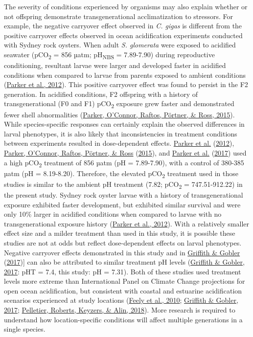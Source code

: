 \documentclass [11pt, proquest] {uwthesis}[2015/03/03]
\begin{document}
The severity of conditions experienced by organisms may also explain whether or not offspring demonstrate transgenerational acclimatization to stressors. For example, the negative carryover effect observed in \emph{C. gigas} is different from the positive carryover effects observed in ocean acidification experiments conducted with Sydney rock oysters. When adult \emph{S. glomerata} were exposed to acidified seawater (pCO\textsubscript{2} = 856 µatm; pH\textsubscript{NBS} = 7.89-7.90) during reproductive conditioning, resultant larvae were larger and developed faster in acidified conditions when compared to larvae from parents exposed to ambient conditions (\protect\hyperlink{ref-Parker2012}{Parker et al., 2012}). This positive carryover effect was found to persist in the F2 generation. In acidified conditions, F2 offspring with a history of transgenerational (F0 and F1) pCO\textsubscript{2} exposure grew faster and demonstrated fewer shell abnormalities (\protect\hyperlink{ref-Parker2015}{Parker, O'Connor, Raftos, Pörtner, \& Ross, 2015}). While species-specific responses can certainly explain the observed differences in larval phenotypes, it is also likely that inconsistencies in treatment conditions between experiments resulted in dose-dependent effects. \protect\hyperlink{ref-Parker2012}{Parker et al.} (\protect\hyperlink{ref-Parker2012}{2012}), \protect\hyperlink{ref-Parker2015}{Parker, O'Connor, Raftos, Pörtner, \& Ross} (\protect\hyperlink{ref-Parker2015}{2015}), and \protect\hyperlink{ref-Parker2017}{Parker et al.} (\protect\hyperlink{ref-Parker2017}{2017}) used a high pCO\textsubscript{2} treatment of 856 µatm (pH = 7.89-7.90), with a control of 380-385 µatm (pH = 8.19-8.20). Therefore, the elevated pCO\textsubscript{2} treatment used in those studies is similar to the ambient pH treatment (7.82; pCO\textsubscript{2} = 747.51-912.22) in the present study. Sydney rock oyster larvae with a history of transgenerational exposure exhibited faster development, but exhibited similar survival and were only 10\% larger in acidified conditions when compared to larvae with no transgenerational exposure history (\protect\hyperlink{ref-Parker2012}{Parker et al., 2012}). With a relatively smaller effect size and a milder treatment than used in this study, it is possible these studies are not at odds but reflect dose-dependent effects on larval phenotypes. Negative carryover effects demonstrated in this study and in \protect\hyperlink{ref-Griffith2017}{Griffith \& Gobler} (\protect\hyperlink{ref-Griffith2017}{2017}){]} can also be attributed to similar treatment pH levels (\protect\hyperlink{ref-Griffith2017}{Griffith \& Gobler, 2017}: pHT = 7.4, this study: pH = 7.31). Both of these studies used treatment levels more extreme than International Panel on Climate Change projections for open ocean acidification, but consistent with coastal and estuarine acidification scenarios experienced at study locations (\protect\hyperlink{ref-Feely2010}{Feely et al., 2010}; \protect\hyperlink{ref-Griffith2017}{Griffith \& Gobler, 2017}; \protect\hyperlink{ref-Pelletier2018}{Pelletier, Roberts, Keyzers, \& Alin, 2018}). More research is required to understand how location-specific conditions will affect multiple generations in a single species.
\end{document}
